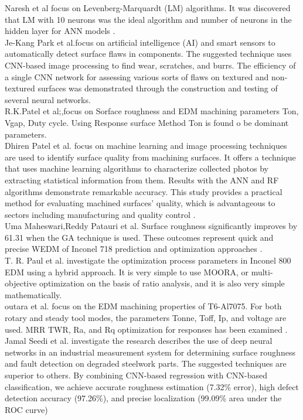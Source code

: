 \cite{naresh2020artificial}Naresh et al focus on Levenberg-Marquardt (LM) algorithms. It was discovered that LM with 10 neurons was the ideal algorithm and number of neurons in the hidden layer for ANN models .\\
\cite{park2016machine}Je-Kang Park et al.focus on artificial intelligence (AI) and smart sensors to automatically detect surface flaws in components. The suggested technique uses CNN-based image processing to find wear, scratches, and burrs. The efficiency of a single CNN network for assessing various sorts of flaws on textured and non-textured surfaces was demonstrated through the construction and testing of several neural networks.\\
\cite{patel2009determination}R.K.Patel et al;,focus on  Sorface roughness and EDM machining parameters Ton, Vgap, Duty cycle. Using Response surface Method  Ton is found o be dominant parameters.\\
\cite{patel2019texture}Dhiren Patel et al. focus on  machine learning and image processing techniques are used to identify surface quality from machining surfaces. It offers a technique that uses machine learning algorithms to characterize collected photos by extracting statistical information from them. Results with the ANN and RF algorithms demonstrate remarkable accuracy. This study provides a practical method for evaluating machined surfaces' quality, which is advantageous to sectors including manufacturing and quality control .\\
\cite{paturi2021machine}Uma Maheswari,Reddy Patauri et al. Surface roughness significantly improves by 61.31 when the GA technique is used. These outcomes represent quick and precise WEDM of Inconel 718 prediction and optimization approaches .\\
\cite{paul2019multi}T. R. Paul et al. investigate the optimization process parameters in Inconel 800 EDM using a hybrid approach. It is very simple to use MOORA, or multi-objective optimization on the basis of ratio analysis, and it is also very simple mathematically.\\
\cite{routara2020investigation}outara et al. focus on the EDM machining properties of T6-Al7075. For both rotary and steady tool modes, the parameters Tonne, Toff, Ip, and voltage are used. MRR TWR, Ra, and Rq optimization for responses has been examined .\\
\cite{saeedi2021measurement}Jamal Seedi et al. investigate the research describes the use of deep neural networks in an industrial measurement system for determining surface roughness and fault detection on degraded steelwork parts. The suggested techniques are superior to others.  By combining CNN-based regression with CNN-based classification, we achieve accurate roughness estimation (7.32\% error), high defect detection accuracy (97.26\%), and precise localization (99.09\% area under the ROC curve) \\
